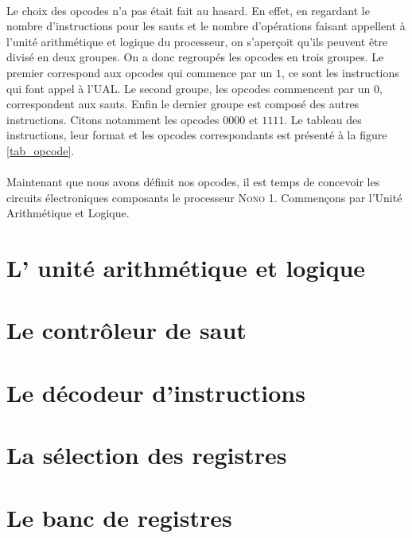 \documentclass[a4paper]{article}
\begin{document}
			\paragraph{}{
			Le choix des opcodes n'a pas était fait au hasard. En effet, en regardant le nombre
			d'instructions pour les sauts et le nombre d'opérations faisant appellent à l'unité
			arithmétique et logique du processeur, on s’aperçoit qu'ils peuvent être divisé 
			en deux 	groupes. On a donc regroupés les opcodes en trois groupes. Le premier 
			correspond aux opcodes qui commence par un $1$, ce sont les instructions qui font 
			appel à l'UAL. Le second groupe, les opcodes commencent par un $0$, correspondent 
			aux sauts. Enfin le dernier groupe est composé des autres instructions. Citons
			notamment les opcodes $0000$ et $1111$. Le tableau des instructions, leur format et
			les opcodes correspondants est présenté à la figure \ref{tab_opcode}.
			}
			
			\paragraph{}{
			Maintenant que nous avons définit nos opcodes, il est temps de concevoir les circuits
			électroniques composants le processeur \textsc{Nono 1}. Commençons par l'Unité 
			Arithmétique et Logique.
			}
	
		\section{L' unité arithmétique et logique}
			
			
		\section{Le contrôleur de saut}
			
			
		\section{Le décodeur d'instructions}
			
			
		\section{La sélection des registres}
			
			
		\section{Le banc de registres}
			
	
\end{document}
